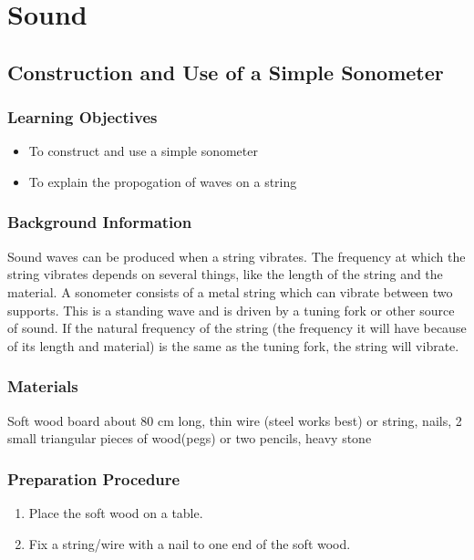 \section{Sound}

\subsection{Construction and Use of a Simple Sonometer}

\subsubsection*{Learning Objectives}
\begin{itemize}
\item{To construct and use a simple sonometer} 
\item{To explain the propogation of waves on a string} 
\end{itemize}

\subsubsection*{Background Information}
Sound waves can be produced when a string vibrates. The frequency at which the string vibrates depends on several things, like the length of the string and the material. A sonometer consists of a metal string which can vibrate between two supports. This is a standing wave and is driven by a tuning fork or other source of sound. If the natural frequency of the string (the frequency it will have because of its length and material) is the same as the tuning fork, the string will vibrate.  

\subsubsection*{Materials}
Soft wood board about 80 cm long, thin wire (steel works best) or string, nails, 2 small triangular pieces of wood(pegs) or two pencils, heavy stone

\subsubsection*{Preparation Procedure}
\begin{enumerate}
\item{Place the soft wood on a table.} 
\item{Fix a string/wire with a nail to one end of the soft wood.} 
\end{enumerate}

